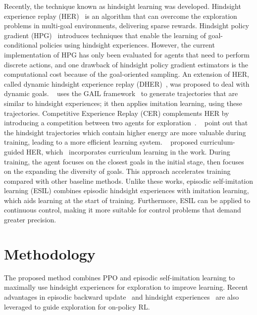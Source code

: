 Recently, the technique known as hindsight learning was developed. Hindsight experience replay (HER)~\cite{andrychowicz2017hindsight} is an algorithm that can overcome the exploration problems in multi-goal environments, delivering sparse rewards. Hindsight policy gradient (HPG)~\cite{rauber2018hindsight} introduces techniques that enable the learning of goal-conditional policies using hindsight experiences. However, the current implementation of HPG has only been evaluated for agents that need to perform discrete actions, and one drawback of hindsight policy gradient estimators is the computational cost because of the goal-oriented sampling. An extension of HER, called dynamic hindsight experience replay (DHER)~\cite{fang2018dher}, was proposed to deal with dynamic goals. ~\cite{liu2019hindsight} uses the GAIL framework~\cite{ho2016generative} to generate trajectories that are similar to hindsight experiences; it then applies imitation learning, using these trajectories. Competitive Experience Replay (CER) complements HER by introducing a competition between two agents for exploration~\cite{liu2018competitive}. ~\cite{zhao2018energy} point out that the hindsight trajectories which contain higher energy are more valuable during training, leading to a more efficient learning system. ~\cite{fang2019curriculum} proposed curriculum-guided HER, which~ incorporates curriculum learning in the work. During training, the agent focuses on the closest goals in the initial stage, then focuses on the expanding the diversity of goals. This approach accelerates training compared with other baseline methods. Unlike these works, episodic self-imitation learning (ESIL) combines episodic hindsight experiences with imitation learning, which aids learning at the start of training. Furthermore, ESIL can be applied to continuous control, making it more suitable for control problems that demand greater precision.

\section{Methodology}
\label{sec:method}
The proposed method combines PPO and episodic self-imitation learning to maximally use hindsight experiences for exploration to improve learning. {Recent advantages in episodic backward update~\cite{lee2019sample} and hindsight experiences~\cite{andrychowicz2017hindsight} are also leveraged} to guide exploration for on-policy RL. 

